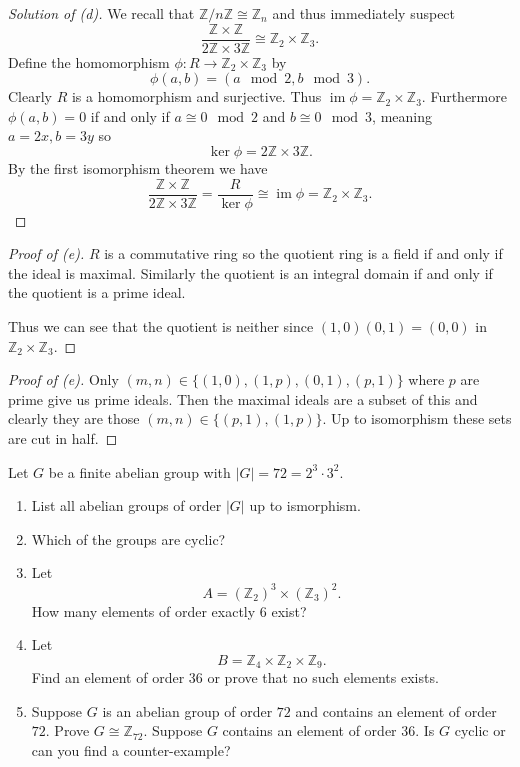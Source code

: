 \begin{proof}[Solution of (d)]
    We recall that $\mathbb Z/n\mathbb Z \cong \mathbb Z_n$ and 
    thus immediately suspect 
    \[
        \frac{\mathbb Z\times \mathbb Z}{2\mathbb Z \times 3 \mathbb Z }
        \cong \mathbb Z_2 \times \mathbb Z_3.
    \]
    Define the homomorphism 
    $\phi : R \to \mathbb Z_2 \times \mathbb Z_3$ by 
    \[
        \phi(a,b) = (a \mod 2, b \mod 3). 
    \]
    Clearly $R$ is a homomorphism and 
    surjective. Thus $\operatorname{im}\phi = 
    \mathbb Z_2 \times \mathbb Z_3$. 
    Furthermore $\phi(a,b) = 0$ if and only if 
    $a \cong 0 \mod 2$ and $b \cong 0 \mod 3$, 
    meaning $a = 2x, b = 3y$ so 
    \[
        \ker \phi = 2\mathbb Z \times 3 \mathbb Z.
    \]
    By the first isomorphism theorem we have 
    \[
        \frac{\mathbb Z\times 
        \mathbb Z}{2\mathbb Z \times 3 \mathbb Z} = 
        \frac{R}{\ker \phi} \cong  
        \operatorname{im} \phi = 
        \mathbb Z_2 \times \mathbb Z_3.
    \]
\end{proof}
\begin{proof}[Proof of (e)]
    $R$ is a commutative ring so the 
    quotient ring is a field if and only if 
    the ideal is maximal. Similarly the 
    quotient is an integral domain if 
    and only if the quotient is a 
    prime ideal. 

    Thus we can see that the quotient is neither 
    since $(1,0)(0,1) = (0,0)$ in $\mathbb 
    Z_2 \times \mathbb Z_3$. 
\end{proof}
\begin{proof}[Proof of (e)]
    Only $(m,n) \in \{(1,0),(1,p),(0,1),(p,1)\}$ 
    where $p$ are prime give us prime ideals. 
    Then the maximal ideals are a subset of this 
    and clearly they are those $(m,n) \in \{(p,1),(1,p)\}$.
    Up to isomorphism these sets are cut in half.
\end{proof}
\begin{prob}
    Let $G$ be a finite abelian group with 
    $|G| = 72 = 2^3 \cdot 3^2$.
    \begin{enumerate}[label=\alph*)]
        \item List all abelian groups of order 
            $|G|$ up to ismorphism.
        \item Which of the groups are cyclic?
        \item Let 
            \[
                A = (\mathbb Z_2)^3 \times 
                (\mathbb Z_3)^2.
            \]
            How many elements of order exactly 
            $6$ exist?
        \item Let 
            \[
                B = \mathbb Z_4 \times 
                \mathbb Z_2 \times \mathbb Z_9.
            \]
            Find an element of order $36$ or 
            prove that no such elements exists. 
        \item Suppose $G$ is an abelian group 
            of order $72$ and contains an 
            element of order $72$. Prove 
            $G \cong \mathbb Z_{72}$.
            Suppose $G$ contains an element 
            of order $36$. Is $G$ cyclic or 
            can you find a counter-example?
    \end{enumerate}
\end{prob}
